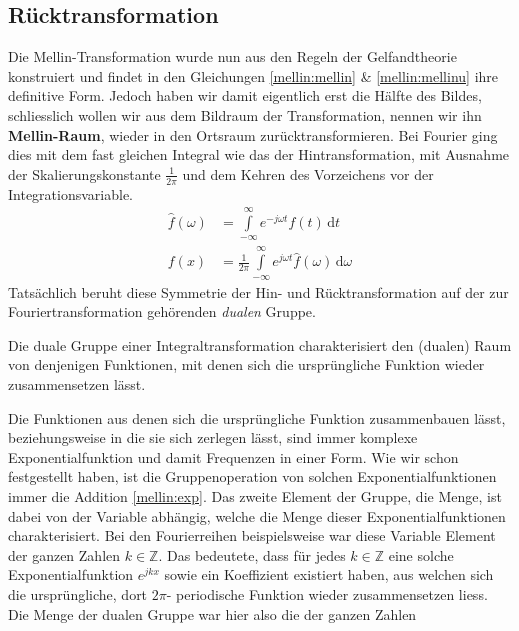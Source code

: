 \subsection{Rücktransformation
\label{mellin:subsection:ruecktransformation}}
Die Mellin-Transformation wurde nun aus den Regeln der Gelfandtheorie 
konstruiert und findet in den Gleichungen \eqref{mellin:mellin} \& 
\eqref{mellin:mellinu} ihre definitive Form.
Jedoch haben wir damit eigentlich erst die Hälfte des Bildes, schliesslich 
wollen wir aus dem Bildraum der Transformation, nennen wir ihn 
\textbf{Mellin-Raum}, wieder in den Ortsraum zurücktransformieren. 
Bei Fourier ging dies mit dem fast gleichen Integral wie das der 
Hintransformation, mit Ausnahme der Skalierungskonstante $\frac{1}{2\pi}$
und dem Kehren des Vorzeichens vor der Integrationsvariable.
\begin{align*}
    \hat{f}(\omega) &= \int\limits_{-\infty}^{\infty} 
    e^{-j\omega{}t} f(t) \,\mathrm{d}t \\
    f(x) &= \frac{1}{2\pi} \int\limits_{-\infty}^{\infty} 
    e^{j\omega t} \hat{f}(\omega) \,\mathrm{d}\omega
\end{align*}
Tatsächlich beruht diese Symmetrie der Hin- und Rücktransformation auf der 
zur Fouriertransformation gehörenden \emph{dualen} Gruppe.
\begin{definition}
    Die duale Gruppe einer Integraltransformation charakterisiert den 
    (dualen) Raum von denjenigen Funktionen, mit denen sich die 
    ursprüngliche Funktion wieder zusammensetzen lässt.
\end{definition}
Die Funktionen aus denen sich die ursprüngliche Funktion zusammenbauen 
lässt, beziehungsweise in die sie sich zerlegen lässt, 
sind immer komplexe Exponentialfunktion und damit Frequenzen in einer Form.
Wie wir schon festgestellt haben, ist die Gruppenoperation von solchen 
Exponentialfunktionen immer die Addition \eqref{mellin:exp}.
Das zweite Element der Gruppe, die Menge, ist dabei von der Variable 
abhängig, welche die Menge dieser Exponentialfunktionen charakterisiert.
Bei den Fourierreihen beispielsweise war diese Variable Element der ganzen 
Zahlen $k \in \mathbb{Z}$.
Das bedeutete, dass für jedes $k \in \mathbb{Z}$ eine solche 
Exponentialfunktion $e^{jkx}$ sowie ein Koeffizient existiert haben, aus 
welchen sich die ursprüngliche, dort $2\pi$- periodische Funktion wieder 
zusammensetzen liess.
Die Menge der dualen Gruppe war hier also die der ganzen Zahlen 
